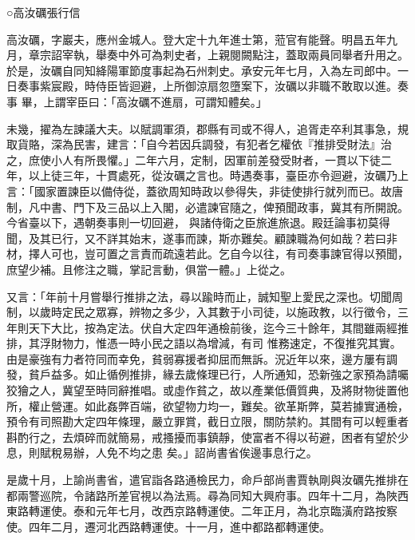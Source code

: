 
\begin{pinyinscope}

 ○高汝礪張行信



 高汝礪，字巖夫，應州金城人。登大定十九年進士第，蒞官有能聲。明昌五年九月，章宗詔宰執，舉奏中外可為刺史者，上親閱闕點注，蓋取兩員同舉者升用之。於是，汝礪自同知絳陽軍節度事起為石州刺史。承安元年七月，入為左司郎中。一日奏事紫宸殿，時侍臣皆迴避，上所御涼扇忽墮案下，汝礪以非職不敢取以進。奏事
 畢，上謂宰臣曰：「高汝礪不進扇，可謂知體矣。」



 未幾，擢為左諫議大夫。以賦調軍須，郡縣有司或不得人，追胥走卒利其事急，規取貨賂，深為民害，建言：「自今若因兵調發，有犯者乞權依『推排受財法』治之，庶使小人有所畏懼。」二年六月，定制，因軍前差發受財者，一貫以下徒二年，以上徒三年，十貫處死，從汝礪之言也。時遇奏事，臺臣亦令迴避，汝礪乃上言：「國家置諫臣以備侍從，蓋欲周知時政以參得失，非徒使排行就列而已。故唐制，凡中書、門下及三品以上入閣，必遣諫官隨之，俾預聞政事，冀其有所開說。今省臺以下，遇朝奏事則一切回避，
 與諸侍衛之臣旅進旅退。殿廷論事初莫得聞，及其已行，又不詳其始末，遂事而諫，斯亦難矣。顧諫職為何如哉？若曰非材，擇人可也，豈可置之言責而疏遠若此。乞自今以往，有司奏事諫官得以預聞，庶望少補。且修注之職，掌記言動，俱當一體。」上從之。



 又言：「年前十月嘗舉行推排之法，尋以踰時而止，誠知聖上愛民之深也。切聞周制，以歲時定民之眾寡，辨物之多少，入其數于小司徒，以施政教，以行徵令，三年則天下大比，按為定法。伏自大定四年通檢前後，迄今三十餘年，其間雖兩經推排，其浮財物力，惟憑一時小民之語以為增減，有司
 惟務速定，不復推究其實。由是豪強有力者符同而幸免，貧弱寡援者抑屈而無訴。況近年以來，邊方屢有調發，貧戶益多。如止循例推排，緣去歲條理已行，人所通知，恐新強之家預為請囑狡獪之人，冀望至時同辭推唱。或虛作貧之，故以產業低價質典，及將財物徙置他所，權止營運。如此姦弊百端，欲望物力均一，難矣。欲革斯弊，莫若據實通檢，預令有司照勘大定四年條理，嚴立罪賞，截日立限，關防禁約。其間有可以輕重者斟酌行之，去煩碎而就簡易，戒搔擾而事鎮靜，使富者不得以茍避，困者有望於少息，則賦稅易辦，人免不均之患
 矣。」詔尚書省俟邊事息行之。



 是歲十月，上諭尚書省，遣官詣各路通檢民力，命戶部尚書賈執剛與汝礪先推排在都兩警巡院，令諸路所差官視以為法焉。尋為同知大興府事。四年十二月，為陜西東路轉運使。泰和元年七月，改西京路轉運使。二年正月，為北京臨潢府路按察使。四年二月，遷河北西路轉運使。十一月，進中都路都轉運使。




\end{pinyinscope}
